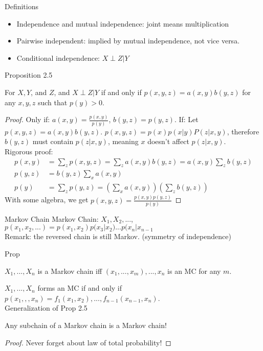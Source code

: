 \documentclass[../main.tex]{subfiles}
\begin{document}
\begin{gbox}{Definitions}
    \begin{itemize}
        \item Independence and mutual independence: joint means multiplication
        \item Pairwise independent: implied by mutual independence, not vice versa. 
        \item Conditional independence: $X \perp Z|Y$
    \end{itemize}
\end{gbox}
\begin{bbox}{Proposition 2.5}
    \begin{proposition}
        For $X,Y$, and $Z$, and $X\perp Z |Y$ if and only if $p(x,y,z)=a(x,y)b(y,z)$ for any $x,y,z$ such that $p(y)>0$.
        
    \end{proposition}
    \begin{proof}
        Only if: $a(x,y)=\frac{p(x,y)}{p(y)}$, $b(y,z)=p(y,z)$.
        If: Let $p(x,y,z)=a(x,y)b(y,z)$.  $p(x,y,z)=p(x) p(x|y) P(z|x,y)$, therefore $b(y,z)$ must contain $p(z|x,y)$, meaning $x$ doesn't affect $p(z|x,y)$.\\
        Rigorous proof: \begin{align*}
            p(x,y)&=\sum_z p(x,y,z) = \sum_z a(x,y)b(y,z)=a(x,y)\sum_z b(y,z)\\
            p(y,z) &= b(y,z)\sum_x a(x,y)\\
            p(y) &= \sum_z p(y,z) =(\sum_x a(x,y))(\sum_z b(y,z))
        \end{align*}
        With some algebra, we get $p(x,y,z)=\frac{p(x,y)p(y,z)}{p(y)}$
    \end{proof}
\end{bbox}
\begin{gbox}{Markov Chain}
    Markov Chain: $X_1,X_2,...$, $p(x_1,x_2,...)=p(x_1,x_2)p(x_3|x_2)...p(x_n|x_{n-1}$\\
    Remark: the reversed chain is still Markov. (symmetry of independence)
\end{gbox}
\begin{bbox}{Prop}
    \begin{proposition}
        $X_1,...,X_n$ is a Markov chain iff $(x_1,...,x_m),...,x_n$ is an MC for any $m$.
    \end{proposition}
    \begin{proposition}
        $X_1,...,X_n$ forms an MC if and only if $p(x_1,,,x_n)= f_1(x_1,x_2),...,f_{n-1}(x_{n-1},x_n)$.\\
        Generalization of Prop 2.5
    \end{proposition} 
    \begin{proposition}
        Any subchain of a Markov chain is a Markov chain!
    \begin{proof}
        Never forget about law of total probability! 
    \end{proof}
    \end{proposition}
\end{bbox}
\end{document}
